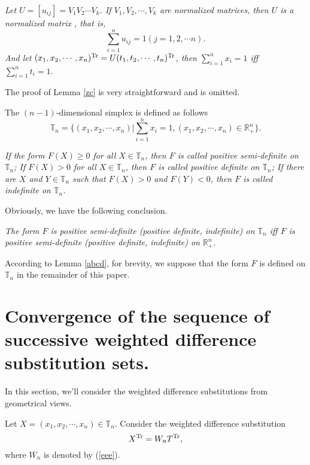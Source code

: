 \documentclass [10pt,a4paper]{article}
\begin{document}
\begin{lemma}  \label{zc}
\emph{Let $ U = [u_{ij}] = V_1 V_2 \cdots V_k$. If
$V_1,V_2,\cdots,V_k$ are normalized matrices, then $U$ is a
normalized matrix , that is,
 \begin{displaymath}
 \sum\limits_{i=1}^nu_{ij}=1(j=1,2,\cdots n).
 \end{displaymath}
 And let
 $(x_1,x_2,\cdots,x_n)^{\textmd{Tr}}=U(t_1,t_2,\cdots,t_n)^{\textmd{Tr}}$,
 then
 $\sum\limits_{i=1}^{n}x_i=1$ iff
 $\sum\limits_{i=1}^{n}t_i=1$.}
\end{lemma}
 The proof of Lemma  \ref{zc} is very straightforward and is omitted.

The $(n-1)$-dimensional simplex  is defined as follows
$$\mathbb{T}_n = \{(x_1,x_2,\cdots,x_n)|\sum\limits_{i=1}^nx_i=1 , (x_1,x_2,\cdots,x_n)\in\mathbb{R}_{+}^{n}\}.$$

\begin{definition}
   \emph{ If the form
   $F(X)\geq0$  for all $X\in\mathbb{T}_n$,  then $F$ is called positive semi-definite on
   $\mathbb{T}_n$;
    If
   $F(X)>0$  for all $X\in\mathbb{T}_n$, then
   $F$ is called positive definite on
   $\mathbb{T}_n$; If there are $X$ and $Y\in \mathbb{T}_n$
such that $F(X)>0$ and  $F(Y)<0$,  then
   $F$ is called indefinite on
   $\mathbb{T}_n$. }
\end{definition}

     Obviously, we have the following conclusion.
 \begin{lemma}  \label{abcd}
\emph{The form $F$ is positive semi-definite (positive definite,
indefinite) on
   $\mathbb{T}_n$ iff $F$ is positive semi-definite (positive definite,
indefinite) on
   $\mathbb{R}_+^n$.}
\end{lemma}

According to Lemma \ref{abcd}, for brevity, we suppose that the form
$F$ is defined  on $\mathbb{T}_n$ in the remainder of this paper.

\section{ Convergence
 of the sequence of successive weighted dif\mbox{}ference substitution sets.}
 In this section, we'll consider the  weighted dif\mbox{}ference
substitutions from geometrical
 views.


 Let $X=(x_1,x_2,\cdots,x_n)\in
\mathbb{T}_n$. Consider the weighted dif\mbox{}ference substitution
  \begin{equation}\label{yangyaos}
X^{\textmd{Tr}}=W_nT^{\textmd{Tr}} ,
  \end{equation}
where $W_n$ is denoted by (\ref{eee}).
\end{document}
